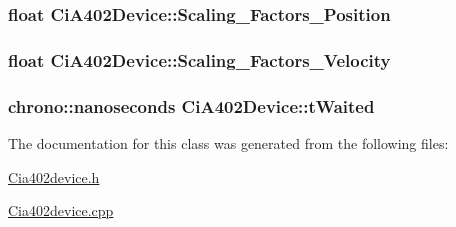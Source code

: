 \subsubsection[{\texorpdfstring{Scaling\+\_\+\+Factors\+\_\+\+Position}{Scaling_Factors_Position}}]{\setlength{\rightskip}{0pt plus 5cm}float Ci\+A402\+Device\+::\+Scaling\+\_\+\+Factors\+\_\+\+Position\hspace{0.3cm}{\ttfamily [private]}}\hypertarget{classCiA402Device_af6df63ddd2ddc1953f847855436ef129}{}\label{classCiA402Device_af6df63ddd2ddc1953f847855436ef129}
\subsubsection[{\texorpdfstring{Scaling\+\_\+\+Factors\+\_\+\+Velocity}{Scaling_Factors_Velocity}}]{\setlength{\rightskip}{0pt plus 5cm}float Ci\+A402\+Device\+::\+Scaling\+\_\+\+Factors\+\_\+\+Velocity\hspace{0.3cm}{\ttfamily [private]}}\hypertarget{classCiA402Device_a57db6ccb730d3c26b7b33000d371b3bf}{}\label{classCiA402Device_a57db6ccb730d3c26b7b33000d371b3bf}
\subsubsection[{\texorpdfstring{t\+Waited}{tWaited}}]{\setlength{\rightskip}{0pt plus 5cm}chrono\+::nanoseconds Ci\+A402\+Device\+::t\+Waited\hspace{0.3cm}{\ttfamily [private]}}\hypertarget{classCiA402Device_ad44fd620387924741772ab8e02d8b95a}{}\label{classCiA402Device_ad44fd620387924741772ab8e02d8b95a}


The documentation for this class was generated from the following files\+:\begin{DoxyCompactItemize}
\item 
\hyperlink{Cia402device_8h}{Cia402device.\+h}\item 
\hyperlink{Cia402device_8cpp}{Cia402device.\+cpp}\end{DoxyCompactItemize}
